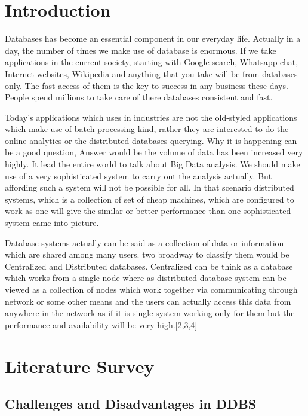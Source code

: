 \documentclass{article}[12pt,a4paper]
\begin{document}
\tableofcontents
\thispagestyle{empty}
\newpage
{}


\section{Introduction}

Databases has become an essential component in our everyday life. Actually in a day, the number of times we make use of database is enormous. If we take applications in the current society, starting with Google search, Whatsapp chat, Internet websites, Wikipedia and anything that you take will be from databases only. The fast access of them is the key to success in any business these days. People spend millions to take care of there databases consistent and fast.

Today’s applications which uses in industries are not the old-styled applications which make use of batch processing kind, rather they are interested to do the online analytics or the distributed databases querying. Why it is happening can be a good question, Answer would be the volume of data has been increased very highly. It lead the entire world to talk about Big Data analysis. We should make use of a very sophisticated system to carry out the analysis actually. But affording such a system will not be possible for all. In that scenario distributed systems, which is a collection of set of cheap machines, which are configured to work as one will give the similar or better performance than one sophisticated system came into picture.

Database systems actually can be said as a collection of data or information which are shared among many users. two broadway to classify them would be Centralized and Distributed databases. Centralized can be think as a database which works from a single node where as distributed database system can be viewed as a collection of nodes which work together via communicating through network or some other means and the users can actually access this data from anywhere in the network as if it is single system working only for them but the performance and availability will be very high.[2,3,4]


\newpage
\section {Literature Survey}
\subsection{Challenges and Disadvantages in DDBS}
\end{document}
